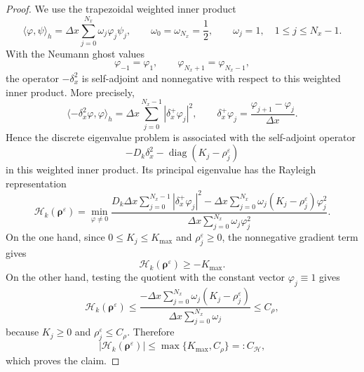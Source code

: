 \documentclass[11pt]{article}
\numberwithin{equation}{section}
\begin{document}
\begin{proof}
We use the trapezoidal weighted inner product
\[
    \langle \varphi,\psi\rangle_h
    =
    \Delta x\sum_{j=0}^{N_x}\omega_j \varphi_j\psi_j,
    \qquad
    \omega_0=\omega_{N_x}=\frac12,\qquad
    \omega_j=1,\quad 1\le j\le N_x-1 .
\]
With the Neumann ghost values
\[
    \varphi_{-1}=\varphi_1,\qquad
    \varphi_{N_x+1}=\varphi_{N_x-1},
\]
the operator \(-\delta_x^2\) is self-adjoint and nonnegative with respect to
this weighted inner product. More precisely,
\[
    \langle -\delta_x^2\varphi,\varphi\rangle_h
    =
    \Delta x\sum_{j=0}^{N_x-1}
    |\delta_x^+\varphi_j|^2,
    \qquad
    \delta_x^+\varphi_j
    =
    \frac{\varphi_{j+1}-\varphi_j}{\Delta x}.
\]
Hence the discrete eigenvalue problem is associated with the self-adjoint
operator
\[
    -D_k\delta_x^2-\operatorname{diag}(K_j-\rho_j^\varepsilon)
\]
in this weighted inner product. Its principal eigenvalue has the Rayleigh
representation
\[
    \mathcal H_k(\boldsymbol\rho^\varepsilon)
    =
    \min_{\varphi\ne0}
    \frac{
        D_k\Delta x\sum_{j=0}^{N_x-1} |\delta_x^+\varphi_j|^2
        -
        \Delta x\sum_{j=0}^{N_x} \omega_j
        (K_j-\rho_j^\varepsilon)\varphi_j^2
    }{
        \Delta x\sum_{j=0}^{N_x} \omega_j \varphi_j^2
    } .
\]
On the one hand, since \(0\le K_j\le K_{\max}\) and
\(\rho_j^\varepsilon\ge0\), the nonnegative gradient term gives
\[
    \mathcal H_k(\boldsymbol\rho^\varepsilon)
    \ge -K_{\max}.
\]
On the other hand, testing the quotient with the constant vector
\(\varphi_j\equiv1\) gives
\[
    \mathcal H_k(\boldsymbol\rho^\varepsilon)
    \le
    \frac{
        -\Delta x\sum_{j=0}^{N_x}\omega_j
        (K_j-\rho_j^\varepsilon)
    }{
        \Delta x\sum_{j=0}^{N_x}\omega_j
    }
    \le C_\rho ,
\]
because \(K_j\ge0\) and \(\rho_j^\varepsilon\le C_\rho\). Therefore
\[
    |\mathcal H_k(\boldsymbol\rho^\varepsilon)|
    \le
    \max\{K_{\max},C_\rho\}
    =:C_{\mathcal H},
\]
which proves the claim.
\end{proof}
\end{document}
